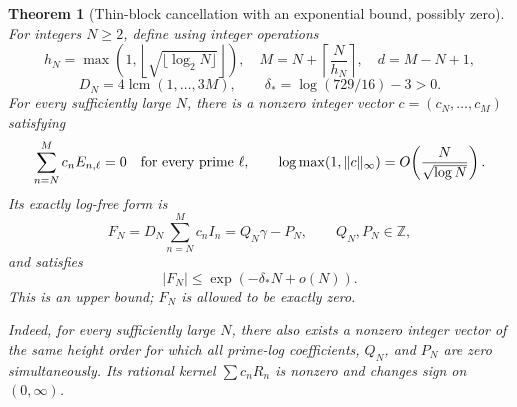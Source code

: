 \documentclass[11pt,a4paper]{article}
\newtheorem{theorem}{Theorem}[section]
\theoremstyle{definition}
\theoremstyle{remark}
\begin{document}
\begin{theorem}[Thin-block cancellation with an exponential bound, possibly zero]
\label{stage3-counting-main}
For integers $N\ge2$, define using integer operations
\[
 h_N=\max\left(1,\left\lfloor\sqrt{\lfloor\log_2N\rfloor}\right\rfloor\right),
 \quad M=N+\left\lceil\frac N{h_N}\right\rceil,
 \quad d=M-N+1,
\]
\[
 D_N=4\operatorname{lcm}(1,\ldots,3M),\qquad
 \delta_* =\log(729/16)-3>0.
\]
For every sufficiently large $N$, there is a nonzero integer vector
$c=(c_N,\ldots,c_M)$ satisfying
\[
 \sum_{n=N}^M c_n E_{n,\ell}=0\quad\hbox{for every prime }\ell,
 \qquad
 \log\max(1,\|c\|_\infty)
       =O\!\left(\frac N{\sqrt{\log N}}\right).
\]
Its exactly log-free form is
\begin{equation}\label{stage3-counting-small-form}
 F_N=D_N\sum_{n=N}^M c_n I_n=Q_N\gamma-P_N,
 \qquad Q_N,P_N\in\mathbb Z,
\end{equation}
and satisfies
\begin{equation}\label{stage3-counting-upper-bound}
 |F_N|\le\exp(-\delta_*N+o(N)).
\end{equation}
This is an upper bound; $F_N$ is allowed to be exactly zero.

Indeed, for every sufficiently large $N$, there also exists a nonzero
integer vector of the same height order for which all prime-log
coefficients, $Q_N$, and $P_N$ are zero simultaneously. Its rational
kernel $\sum c_nR_n$ is nonzero and changes sign on $(0,\infty)$.
\end{theorem}
\end{document}
